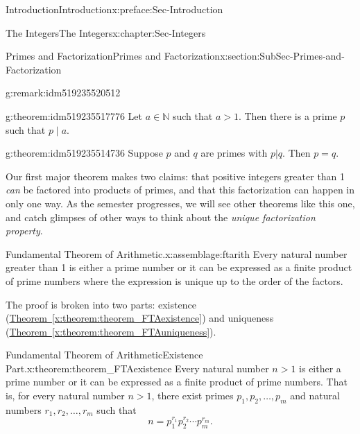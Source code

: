 \documentclass[oneside,10pt,]{book}
\newcommand{\xreffont}{\relax}
\numberwithin{equation}{section}
\def\N{{\mathbb N}}
\begin{document}
\begin{preface}{Introduction}{}{Introduction}{}{}{x:preface:Sec-Introduction}
\begin{chapterptx}{The Integers}{}{The Integers}{}{}{x:chapter:Sec-Integers}
\begin{sectionptx}{Primes and Factorization}{}{Primes and Factorization}{}{}{x:section:SubSec-Primes-and-Factorization}
\begin{remark}{}{g:remark:idm519235520512}
\end{remark}
\begin{theorem}{}{}{g:theorem:idm519235517776}%
Let \(a\in \N\) such that \(a > 1\). Then there is a prime \(p\) such that \(p\mid a\).%
\end{theorem}
\begin{theorem}{}{}{g:theorem:idm519235514736}%
Suppose \(p\) and \(q\) are primes with \(p|q\). Then \(p = q\).%
\end{theorem}
Our first major theorem makes two claims: that positive integers greater than 1 \emph{can} be factored into products of primes, and that this factorization can happen in only one way. As the semester progresses, we will see other theorems like this one, and catch glimpses of other ways to think about the \emph{unique factorization property}.%
\begin{assemblage}{Fundamental Theorem of Arithmetic.}{x:assemblage:ftarith}%
Every natural number greater than 1 is either a prime number or it can be expressed as a finite product of prime numbers where the expression is unique up to the order of the factors.%
\end{assemblage}
The proof is broken into two parts: existence (\hyperref[x:theorem:theorem_FTAexistence]{Theorem~{\xreffont\ref{x:theorem:theorem_FTAexistence}}}) and uniqueness (\hyperref[x:theorem:theorem_FTAuniqueness]{Theorem~{\xreffont\ref{x:theorem:theorem_FTAuniqueness}}}).%
\begin{theorem}{Fundamental Theorem of Arithmetic\textendash{}Existence Part\footnotemark{}.}{}{x:theorem:theorem_FTAexistence}%
Every natural number \(n > 1\) is either a prime number or it can be expressed as a finite product of prime numbers. That is, for every natural number \(n > 1\), there exist primes \(p_1, p_2, \ldots,
p_m\) and natural numbers \(r_1, r_2, \ldots, r_m\) such that%
\begin{equation*}
n = p_1^{r_1} p_2^{r_2} \cdots p_m^{r_m}\text{.}
\end{equation*}


\end{theorem}
\end{sectionptx}
\end{chapterptx}
\end{preface}
\end{document}
